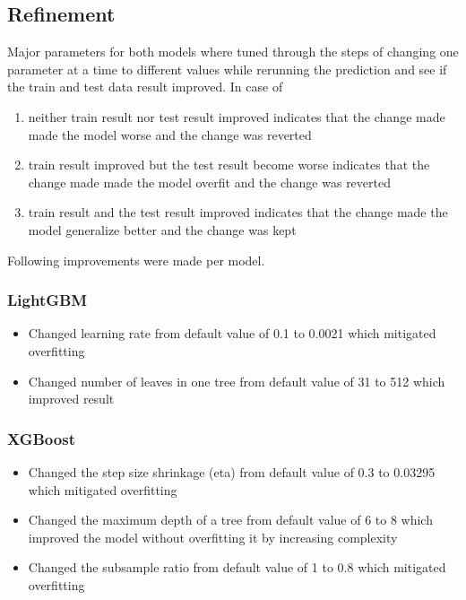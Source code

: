 \documentclass[a4paper]{article}
\begin{document}
\subsection{Refinement}
Major parameters for both models where tuned through the steps of changing one parameter at a time to different
values while rerunning the prediction and see if the train and test data result improved. In case of
\begin{enumerate}
    \item neither train result nor test result improved indicates that the change made made the model worse
        and the change was reverted
    \item train result improved but the test result become worse indicates that the change made made the model overfit
        and the change was reverted
    \item train result and the test result improved indicates that the change made the model generalize better and
        the change was kept
\end{enumerate}

Following improvements were made per model.
\subsubsection{LightGBM}
\begin{itemize}
    \item Changed learning rate from default value of 0.1 to 0.0021 which mitigated overfitting
    \item Changed number of leaves in one tree from default value of 31 to 512 which improved result
\end{itemize}
\subsubsection{XGBoost}
\begin{itemize}
    \item Changed the step size shrinkage (eta) from default value of 0.3 to 0.03295 which mitigated overfitting
    \item Changed the maximum depth of a tree from default value of 6 to 8 which improved the model
        without overfitting it by increasing complexity
    \item Changed the subsample ratio from default value of 1 to 0.8 which mitigated overfitting
\end{itemize}
\end{document}
